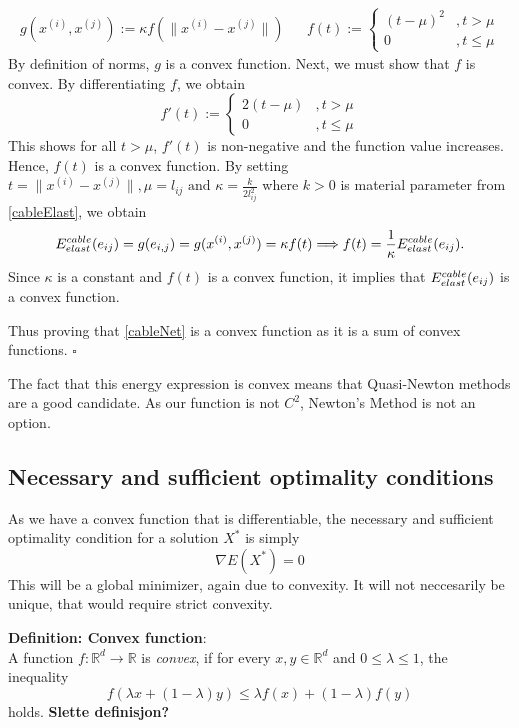 \begin{align*}
    g(x^{(i)},x^{(j)}) := \kappa f(\|x^{(i)} - x^{(j)}\|) && 
    f(t) := \begin{cases}
            (t - \mu)^2  & , t > \mu \\
            0           & , t \leq \mu
            \end{cases}
\end{align*}
By definition of norms, $g$ is a convex function. Next, we must show that $f$ is convex.
By differentiating $f$, we obtain 
$$
f'(t) := \begin{cases}
        2(t-\mu) &, t > \mu \\
        0       &, t \leq \mu
        \end{cases}
$$ 
This shows for all $t > \mu$, $f'(t)$ is non-negative and the function value increases. Hence, $f(t)$ is a convex function. By setting 
$t = \|x^{(i)} - x^{(j)}\|, \mu = l_{ij} \text{ and } \kappa = \frac{k}{2l^2_{ij}}$ where $k > 0$ is material parameter from \eqref{cableElast}, we obtain 
\begin{equation*}
    E^{cable}_{elast}(e_{ij}) = g(e_{i, j}) = g(x^{(i)}, x^{(j)}) = \kappa f(t) \Longrightarrow f(t) = \frac{1}{\kappa} E^{cable}_{elast}(e_{ij}).  
\end{equation*} 
Since $\kappa$ is a constant and $f(t)$ is a convex function, it implies that $E^{cable}_{elast}(e_{ij})$ is a convex function.

Thus proving that \eqref{cableNet} is a convex function as it is a sum of convex functions. \hfill $\square$

The fact that this energy expression is convex means that Quasi-Newton methods are a good candidate. As our function is not $C^2$, Newton's Method is not an option. 

\subsection{Necessary and sufficient optimality conditions}
As we have a convex function that is differentiable, the necessary and sufficient optimality condition for a solution $X^*$ is simply \begin{equation}
    \nabla E(X^*) = 0
\end{equation}
This will be a global minimizer, again due to convexity. It will not neccesarily be unique, that would require strict convexity.


\hrulefill

\textbf{Definition: Convex function}:\\ 
A function $f: \mathbb{R}^d \rightarrow \mathbb{R}$ is \textit{convex}, if for every $x, y \in \mathbb{R}^d $ and $0 \leq \lambda \leq 1$, the inequality
\begin{equation}
    \label{convexity}
    f(\lambda x + (1- \lambda) y ) \leq \lambda f(x) + (1-\lambda) f(y)
\end{equation}
holds. 
\textbf{Slette definisjon?}

\hrulefill






